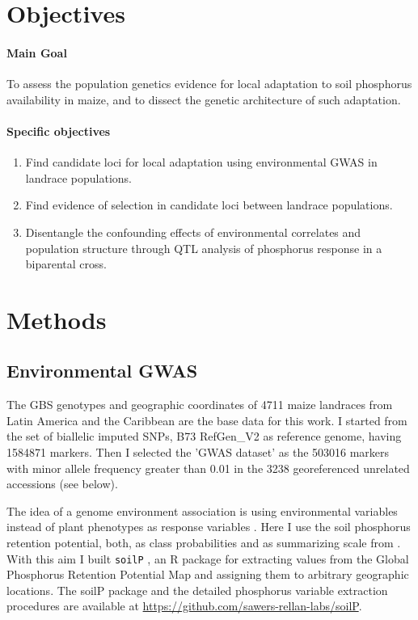 \documentclass[10pt,letterpaper]{article}
\begin{document}
\section*{Objectives}

\paragraph{Main Goal} 

To assess the population genetics evidence for local adaptation to soil phosphorus availability in maize, and to dissect the genetic architecture of such adaptation.


\paragraph{Specific objectives}

\begin{enumerate}  
\item Find candidate loci for local adaptation using environmental GWAS in landrace populations.

\item Find evidence of selection in candidate loci between landrace populations.

\item Disentangle the confounding effects of environmental correlates and population structure through QTL analysis of phosphorus response in a biparental cross.
 
\end{enumerate}

\section*{Methods}
\subsection*{Environmental GWAS}

The GBS genotypes and geographic coordinates of 4711 maize landraces  from Latin America and the Caribbean  \cite{romeronavarro2017} are the base data for this work. I started from the set of biallelic imputed SNPs, B73 RefGen\_V2 as reference genome, having 1584871 markers. Then I selected  the 'GWAS dataset' as the 503016 markers with minor allele frequency greater than 0.01 in the 3238 georeferenced unrelated accessions (see below). 

The idea of a genome environment association is using environmental variables instead  of plant phenotypes as response variables \cite{lasky2015}. Here I use the soil phosphorus retention potential, both, as class probabilities and as summarizing scale from \cite{batjes2011}. With this aim I built \texttt{soilP} \cite{rodriguez-zapata2018}, an R package for extracting values from the Global Phosphorus Retention Potential Map and assigning them to arbitrary geographic locations. The soilP package and the detailed phosphorus variable extraction procedures are available at \url{https://github.com/sawers-rellan-labs/soilP}.
\end{document}
